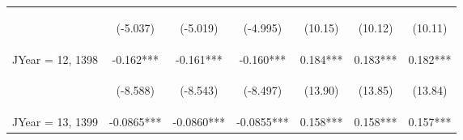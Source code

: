 \documentclass[]{article}
\begin{document}
\begin{center}
\begin{tabular}{lcccccc}
        \vspace{4pt}     & \begin{footnotesize}(-5.037)\end{footnotesize} & \begin{footnotesize}(-5.019)\end{footnotesize} & \begin{footnotesize}(-4.995)\end{footnotesize} & \begin{footnotesize}(10.15)\end{footnotesize}  & \begin{footnotesize}(10.12)\end{footnotesize}  & \begin{footnotesize}(10.11)\end{footnotesize}  \\
        JYear = 12, 1398 & -0.162***                                      & -0.161***                                      & -0.160***                                      & 0.184***                                       & 0.183***                                       & 0.182***                                       \\
        \vspace{4pt}     & \begin{footnotesize}(-8.588)\end{footnotesize} & \begin{footnotesize}(-8.543)\end{footnotesize} & \begin{footnotesize}(-8.497)\end{footnotesize} & \begin{footnotesize}(13.90)\end{footnotesize}  & \begin{footnotesize}(13.85)\end{footnotesize}  & \begin{footnotesize}(13.84)\end{footnotesize}  \\
        JYear = 13, 1399 & -0.0865***                                     & -0.0860***                                     & -0.0855***                                     & 0.158***                                       & 0.158***                                       & 0.157***                                       \\

\end{tabular}
\end{center}
\end{document}
